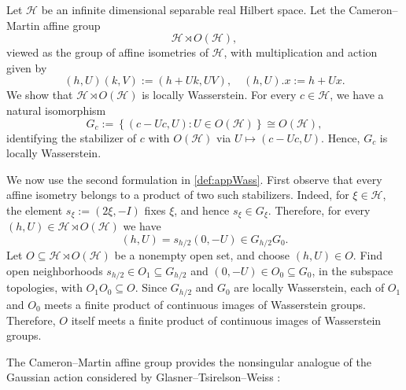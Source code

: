 \documentclass{amsart}
\numberwithin{equation}{subsection}
\theoremstyle{plain}
\theoremstyle{definition}
\theoremstyle{plain}
\begin{document}
Let \(\mathcal{H}\) be an infinite dimensional separable real Hilbert space. Let the Cameron--Martin affine group
\[\mathcal{H}\rtimes O\left(\mathcal{H}\right),\]
viewed as the group of affine isometries of \(\mathcal{H}\), with multiplication and action given by
\[\left(h,U\right)\left(k,V\right):=\left(h+Uk,UV\right),\quad \left(h,U\right).x:=h+Ux.\]
We show that \(\mathcal{H}\rtimes O\left(\mathcal{H}\right)\) is locally Wasserstein. For every \(c\in\mathcal{H}\), we have a natural isomorphism
\[G_{c}:=\left\{\left(c-Uc,U\right):U\in O\left(\mathcal{H}\right)\right\}\cong O\left(\mathcal{H}\right),\]
identifying the stabilizer of \(c\) with \(O\left(\mathcal{H}\right)\) via \(U\mapsto\left(c-Uc,U\right)\). Hence, \(G_{c}\) is locally Wasserstein.

\smallskip

We now use the second formulation in \cref{def:appWass}. First observe that every affine isometry belongs to a product of two such stabilizers. Indeed, for \(\xi\in\mathcal{H}\), the element \(s_{\xi}:=\left(2\xi,-I\right)\) fixes \(\xi\), and hence \(s_{\xi}\in G_{\xi}\). Therefore, for every \(\left(h,U\right)\in\mathcal{H}\rtimes O\left(\mathcal{H}\right)\) we have
\[\left(h,U\right)=s_{h/2}\left(0,-U\right)\in G_{h/2}G_{0}.\]
Let \(O\subseteq\mathcal{H}\rtimes O\left(\mathcal{H}\right)\) be a nonempty open set, and choose \(\left(h,U\right)\in O\). Find open neighborhoods \(s_{h/2}\in O_{1}\subseteq G_{h/2}\) and \(\left(0,-U\right)\in O_{0}\subseteq G_{0}\), in the subspace topologies, with \(O_{1}O_{0}\subseteq O\). Since \(G_{h/2}\) and \(G_{0}\) are locally Wasserstein, each of \(O_{1}\) and \(O_{0}\) meets a finite product of continuous images of Wasserstein groups. Therefore, \(O\) itself meets a finite product of continuous images of Wasserstein groups.

\smallskip

The Cameron--Martin affine group provides the nonsingular analogue of the Gaussian action considered by Glasner--Tsirelson--Weiss \cite[\S4]{glasner2005automorphism}:
\end{document}
